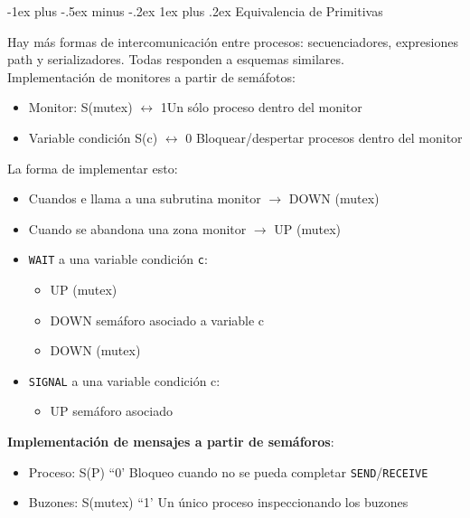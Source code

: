 \documentclass[10pt,portrait, twocolumn]{article}
\makeatletter
\renewcommand{\subsubsection}{\@startsection{subsubsection}{3}{0mm}%
                                {-1ex plus -.5ex minus -.2ex}%
                                {1ex plus .2ex}%
                                {\normalfont\small\bfseries}}
\makeatother
\begin{document}
	
\subsubsection{Equivalencia de Primitivas}

Hay más formas de intercomunicación entre procesos: secuenciadores, expresiones path y serializadores. Todas responden a esquemas similares. \\

Implementación de monitores a partir de semáfotos:

	\begin{itemize}
	\item Monitor: S(mutex) $\leftrightarrow$ 1Un sólo proceso dentro del monitor
	\item Variable condición S(c) $\leftrightarrow$ 0 Bloquear/despertar procesos dentro del monitor
	\end{itemize}

La forma de implementar esto:

	\begin{itemize}
	\item Cuandos e llama a una subrutina monitor $\rightarrow$ DOWN (mutex)
	\item Cuando se abandona una zona monitor $\rightarrow$ UP (mutex)
	\item \texttt{WAIT} a una variable condición \texttt{c}:
		\begin{itemize}
		\item UP (mutex)
		\item DOWN semáforo asociado a variable c
		\item  DOWN (mutex)
		\end{itemize}
	\item \texttt{SIGNAL} a una variable condición c:
		\begin{itemize}
		\item UP semáforo asociado
		\end{itemize}
	\end{itemize}
	
\textbf{Implementación de mensajes a partir de semáforos}:

	\begin{itemize}
	\item Proceso: S(P) ``0' Bloqueo cuando no se pueda completar \texttt{SEND}/\texttt{RECEIVE}
	\item Buzones: S(mutex) ``1' Un único proceso inspeccionando los buzones
	\end{itemize}
	
\end{document}

